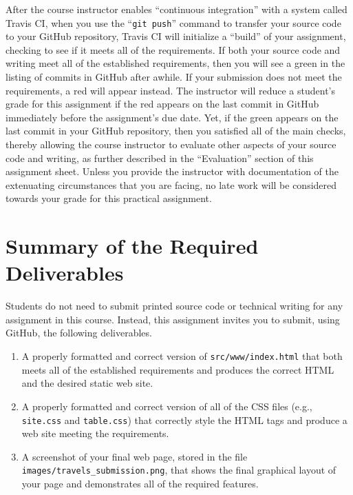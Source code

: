 \documentclass[11pt]{article}
\newcommand{\mainprogramsource}{\lstinline{src/www/index.html}}
\newcommand{\mainimagesource}{\lstinline{images/travels_submission.png}}
\newcommand{\gitpush}{\command{git push}}
\newcommand{\command}[1]{``\lstinline{#1}''}
\newcommand{\program}[1]{\lstinline{#1}}
\newcommand{\step}[1]{``{#1}''}
\newcommand{\checkmark}{\ding{51}}
\newcommand{\naughtmark}{\ding{55}}
\begin{document}
After the course instructor enables \step{continuous integration} with a system
called Travis CI, when you use the \gitpush{} command to transfer your source
code to your GitHub repository, Travis CI will initialize a \step{build} of your
assignment, checking to see if it meets all of the requirements. If both your
source code and writing meet all of the established requirements, then you will
see a green \checkmark{} in the listing of commits in GitHub after awhile. If
your submission does not meet the requirements, a red \naughtmark{} will appear
instead. The instructor will reduce a student's grade for this assignment if the
red \naughtmark{} appears on the last commit in GitHub immediately before the
assignment's due date. Yet, if the green \checkmark{} appears on the last commit
in your GitHub repository, then you satisfied all of the main checks, thereby
allowing the course instructor to evaluate other aspects of your source code and
writing, as further described in the \step{Evaluation} section of this
assignment sheet. Unless you provide the instructor with documentation of the
extenuating circumstances that you are facing, no late work will be considered
towards your grade for this practical assignment.

\section*{Summary of the Required Deliverables}

\noindent Students do not need to submit printed source code or technical
writing for any assignment in this course. Instead, this assignment invites you
to submit, using GitHub, the following deliverables.

\begin{enumerate}

\setlength{\itemsep}{0in}

\item A properly formatted and correct version of \mainprogramsource{} that both
  meets all of the established requirements and produces the correct HTML and
  the desired static web site.

\item A properly formatted and correct version of all of the CSS files (e.g.,
  \program{site.css} and \program{table.css}) that correctly style the HTML tags
  and produce a web site meeting the requirements.

\item A screenshot of your final web page, stored in the file
  \mainimagesource{}, that shows the final graphical layout of your page and
  demonstrates all of the required features.

\end{enumerate}
\end{document}
